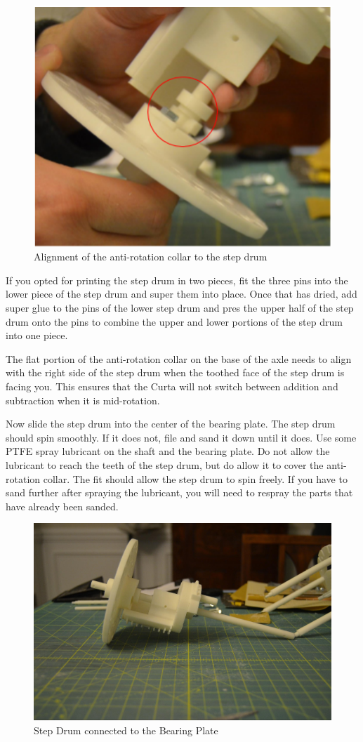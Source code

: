 \documentclass[openany]{book}
\begin{document}
\begin{figure}[!ht]
 \centering
 \includegraphics[width=.5\textwidth]{images/anti-rotation-collar.png}
 \caption{Alignment of the anti-rotation collar to the step drum}
\end{figure}

If you opted for printing the step drum in two pieces, fit the three pins into the lower piece of 
the step drum and super them into place. Once that has dried, add super glue to the pins of the lower
step drum and pres the upper half of the step drum onto the pins to combine the upper and lower
portions of the step drum into one piece.




The flat portion of the anti-rotation collar on the base of the axle needs to align with the right
side of the step drum when the toothed face of the step drum is facing you. This ensures that
the Curta will not switch between addition and subtraction when it is mid-rotation.



Now slide the step drum into the center of the bearing plate. The step drum should spin smoothly.
If it does not, file and sand it down until it does. Use some PTFE spray lubricant on the shaft and
the bearing plate. Do not allow the lubricant to reach the teeth of the step drum, but do allow it
to cover the anti-rotation collar. The fit should allow the step drum to spin freely. If you have to
sand further after spraying the lubricant, you will need to respray the parts that have already been
sanded.

\begin{figure}[!ht]
	\centering
	\includegraphics[width=.75\textwidth]{images/image9.jpg}
	\caption{Step Drum connected to the Bearing Plate}
	\label{fig:image9}	
\end{figure}
\end{document}
